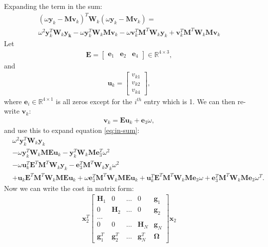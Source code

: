 \documentclass{article}
\newcommand{\mbf}[1]{\mathbf{#1}}
\newcommand{\bbm}{\begin{bmatrix}}
\newcommand{\ebm}{\end{bmatrix}}
\begin{document}
Expanding the term in the sum:
\begin{align}
(\omega\mbf{y}_k - \mbf{M} \mbf{v}_k)^T \mbf{W}_k (\omega \mbf{y}_k - \mbf{M} \mbf{v}_k) = \\
\omega^2 \mbf{y}_k^T \mbf{W}_k \mbf{y_k} - \omega\mbf{y}_k^T \mbf{W}_k \mbf{M} \mbf{v}_k - \omega  \mbf{v}_k^T\mbf{M}^T\mbf{W}_k \mbf{y}_k + \mbf{v}_k^T\mbf{M}^T\mbf{W}_k \mbf{M} \mbf{v}_k \label{eq:in-sum}
\end{align}
Let
\begin{align}
    \mbf{E} = \bbm
        \mbf{e}_1 & \mbf{e}_2 & \mbf{e}_4
    \ebm \in \mathbb{R}^{4 \times 3},
\end{align}
and
\begin{align}
    \mbf{u}_k = \bbm
        v_{k1} \\
        v_{k2} \\
        v_{k4}
    \ebm,
\end{align}
where $\mbf{e}_i \in \mathbb{R}^{4\times 1}$ is all zeros except for the $i^{th}$ entry which is 1.
We can then re-write $\mbf{v}_k$:
\begin{align}
    \mbf{v}_k = \mbf{E}\mbf{u}_k + \mbf{e}_3 \omega,
\end{align}
and use this to expand equation \ref{eq:in-sum}:
\begin{align}
    &\omega^2 \mbf{y}_k^T \mbf{W}_k \mbf{y}_k \\
    &- \omega \mbf{y}_k^T \mbf{W}_k \mbf{M} \mbf{E} \mbf{u}_k - \mbf{y}_k^T \mbf{W}_k \mbf{M} \mbf{e}_3^T \omega^2 \\
    &- \omega \mbf{u}_k^T \mbf{E}^T \mbf{M}^T \mbf{W}_k \mbf{y}_k - \mbf{e}_3^T \mbf{M}^T \mbf{W}_k \mbf{y}_k \omega^2 \\
    &+ \mbf{u}_k \mbf{E}^T \mbf{M}^T \mbf{W}_k \mbf{M} \mbf{E} \mbf{u}_k + \omega \mbf{e}_3^T \mbf{M}^T \mbf{W}_k \mbf{M} \mbf{E} \mbf{u}_k + \mbf{u}_k^T \mbf{E}^T \mbf{M}^T \mbf{W}_k \mbf{M} \mbf{e}_3 \omega + \mbf{e}_3^T \mbf{M}^T \mbf{W}_k \mbf{M} \mbf{e}_3 \omega^T.
\end{align}
Now we can write the cost in matrix form:
\begin{align}
    \mbf{x}_2^T
    \bbm
        \mbf{H}_1 & 0 & \dots & 0 & \mbf{g}_1 \\
        0 & \mbf{H}_2 & \dots & 0 & \mbf{g}_2 \\
        \dots \\
        0 & 0 & \dots & \mbf{H}_N & \mbf{g}_N \\ 
        \mbf{g}_1^T & \mbf{g}_2^T & \dots &  \mbf{g}_N^T & \mbf{\Omega}
    \ebm  
    \mbf{x}_2
\end{align}
\end{document}

